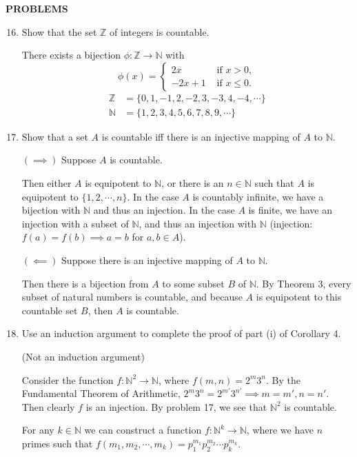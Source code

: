 \begin{center}
	\textbf{PROBLEMS}
\end{center}
\begin{enumerate}
	\setcounter{enumi}{15}
	\item Show that the set $\mathbb{Z}$ of integers is countable.\par
	There exists a bijection $\phi: \mathbb{Z} \to \mathbb{N}$ with
	\[ 
		\phi(x) =
		\begin{cases} 
			2x & \text{ if } x > 0, \\
			-2x+1 & \text{ if } x \le 0.
		\end{cases}
	\]
	\begin{align*}
		\mathbb{Z} &= \{0,1,-1,2,-2,3,-3,4,-4, \cdots\} \\
		\mathbb{N} &= \{1,2,3,4,5,6,7,8,9, \cdots\}
	\end{align*}
	\item Show that a set $A$ is countable iff there is an injective mapping of $A$ to $\mathbb{N}$.\par
	$(\implies)$ Suppose $A$ is countable.\par
	Then either $A$ is equipotent to $\mathbb{N}$, or there is an $n \in \mathbb{N}$ such that $A$ is equipotent to $\{1,2, \cdots, n \}$.
	In the case $A$ is countably infinite, we have a bijection with $\mathbb{N}$ and thus an injection. In the case $A$ is finite, we have an injection with a subset of $\mathbb{N}$, and thus an injection with $\mathbb{N}$
	(injection: $f(a)=f(b) \implies a=b$ for $a,b \in A$).
	\par
	$(\impliedby)$ Suppose there is an injective mapping of $A$ to $\mathbb{N}$.\par
	Then there is a bijection from $A$ to some subset $B$ of $\mathbb{N}$.
	By Theorem 3, every subset of natural numbers is countable, and because $A$ is equipotent to this countable set $B$, then $A$ is countable.
	\item Use an induction argument to complete the proof of part (i) of Corollary 4.\par
	(Not an induction argument)\par
	Consider the function $f:\mathbb{N}^2 \to \mathbb{N}$, where $f(m,n) = 2^m3^n$. 
	By the Fundamental Theorem of Arithmetic, $2^m3^n = 2^{m'}3^{n'} \implies m=m',n=n'$.
	Then clearly $f$ is an injection. By problem 17, we see that $\mathbb{N}^2$ is countable.
	\par
	For any $k\in \mathbb{N}$ we can construct a function $f:\mathbb{N}^k \to \mathbb{N}$, where we have $n$ primes such that $f(m_1,m_2, \cdots, m_k) = p_1^{m_1}p_2^{m_2} \cdots p_k^{m_k}$.

\end{enumerate}
